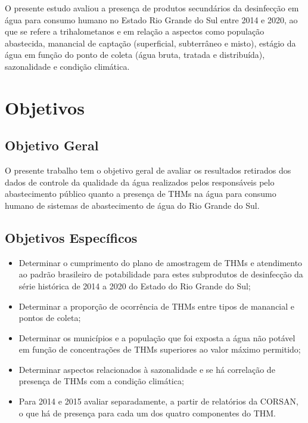 O presente estudo avaliou a presença de produtos secundários da desinfecção em água para consumo humano no Estado Rio Grande do Sul entre 2014 e 2020, ao que se refere a trihalometanos e  em relação a aspectos como população abastecida, manancial de captação (superficial, subterrâneo e misto), estágio da água em função do ponto de coleta (água bruta, tratada e distribuída), sazonalidade e condição climática. 


\chapter{Objetivos} \label{Objetivos}
\section{Objetivo Geral}
O presente trabalho tem o objetivo geral de avaliar os resultados retirados dos dados de controle da qualidade da água realizados pelos responsáveis pelo abastecimento público quanto a presença de THMs na água para consumo humano de sistemas de abastecimento de água do Rio Grande do Sul.

\section{Objetivos Específicos}

\begin{itemize}
  \item	Determinar o cumprimento do plano de amostragem de THMs e atendimento ao padrão brasileiro de potabilidade para estes subprodutos de desinfecção da  série histórica de 2014 a 2020 do Estado do Rio Grande do Sul;

  
  \item Determinar a proporção de ocorrência de THMs entre tipos de manancial e pontos de coleta;
  \item	Determinar os municípios e a população que foi exposta a água não potável em função de concentrações de THMs superiores ao valor máximo permitido;
  \item Determinar aspectos relacionados à sazonalidade e se há correlação de presença de THMs com a condição climática;
  \item Para 2014 e 2015 avaliar separadamente, a partir de relatórios da CORSAN, o que há de presença para cada um dos quatro componentes do THM.

\end{itemize}
 





